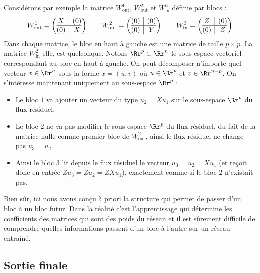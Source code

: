 \documentclass[11pt,class=report,crop=false]{standalone}
\begin{document}
Considérons par exemple la matrice $W_{\text{out}}^1$, $W_{\text{out}}^2$ et $W_{\text{in}}^3$ définie par blocs :
\[
W_{\text{out}}^1 = 
\left(\begin{array}{@{}c|c@{}}
	X & (0)  \\
	\hline
	(0) & \tilde X	
\end{array}\right)
\qquad
W_{\text{out}}^2 = 
\left(\begin{array}{@{}c|c@{}}
	(0) & (0)  \\
	\hline
	(0) & \tilde Y	
\end{array}\right)
\qquad
W_{\text{in}}^3 = 
\left(\begin{array}{@{}c|c@{}}
	Z & (0)  \\
	\hline
	(0) & \tilde Z	
\end{array}\right)
\]
Dans chaque matrice, le bloc en haut à gauche est une matrice de taille $p \times p$.
La matrice $W_{\text{in}}^2$ elle, est quelconque.
Notons $\Rr^p \subset \Rr^n$ le sous-espace vectoriel correspondant au bloc en haut à gauche. On peut décomposer n'importe quel vecteur $x \in \Rr^n$ sous la forme $x = (u, v)$ où $u \in \Rr^p$ et $v \in \Rr^{n-p}$.
On s'intéresse maintenant uniquement au sous-espace $\Rr^p$ :
\begin{itemize}
	\item Le bloc $1$ va ajouter un vecteur du type $u_2 = X u_1$ sur le sous-espace $\Rr^p$ du flux résiduel.
	
	\item Le bloc $2$ ne va pas modifier le sous-espace $\Rr^p$ du flux résiduel, du fait de la matrice nulle comme premier bloc de $W_{\text{out}}^2$, ainsi le flux résiduel ne change pas $u_3 = u_2$.
	\item Ainsi le bloc $3$ lit depuis le flux résiduel le vecteur $u_3 = u_2 = X u_1$ (et reçoit donc en entrée $Zu_3=Zu_2=ZXu_1$), exactement comme si le bloc $2$ n'existait pas.
\end{itemize}

Bien sûr, ici nous avons conçu à priori la structure qui permet de passer d'un bloc à un bloc futur. Dans la réalité c'est l'apprentissage qui détermine les coefficients des matrices qui sont des poids du réseau et il est sûrement difficile de comprendre quelles informations passent d'un bloc à l'autre sur un réseau entraîné.


\subsection{Sortie finale}
\end{document}
